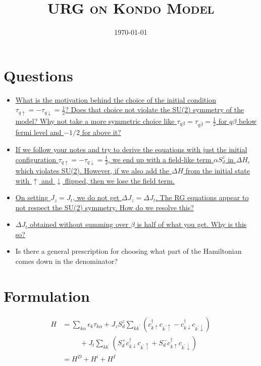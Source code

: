 \documentclass[14pt]{extarticle}
\author{}
\date{\today}
\title{\textsc{URG on Kondo Model}}
\numberwithin{equation}{section}
\begin{document}
\maketitle
\tableofcontents
\newpage
\section{Questions}
\begin{itemize}
	\item \hyperlink{q1}{ What is the motivation behind the choice of the initial condition $\tau_{q \uparrow} = -\tau_{q\downarrow} = \frac{1}{2}$? Does that choice not violate the SU(2) symmetry of the model? Why not take a more symmetric choice like $\tau_{q\beta} =  \tau_{q\bar{\beta}} = \frac{1}{2}$ for $q\beta$ below fermi level and $-1/2$ for above it?}\\[10pt]
	\item \hyperlink{field}{If we follow your notes and try to derive the equations with just the initial configuration $\tau_{q \uparrow} = -\tau_{q\downarrow} = \frac{1}{2}$, we end up with a field-like term \(\alpha S_d^z\) in \(\Delta H\), which violates SU(2). However, if we also add the \(\Delta H\) from the initial state with \(\uparrow\) and \(\downarrow\) flipped, then we lose the field term.}\\[10pt]
	\item \hyperlink{q3}{On setting \(J_z=J_t\), we do not get \(\Delta J_z = \Delta J_t\). The RG equations appear to not respect the SU(2) symmetry. How do we resolve this?}\\[10pt]
	\item \hyperlink{q4}{\(\Delta J_t\) obtained without summing over \(\beta\) is half of what you get. Why is this so?}\\[10pt]
	\item Is there a general prescription for choosing what part of the Hamiltonian comes down in the denominator?
\end{itemize}

\newpage
\section{Formulation}

\begin{align}
 H &= \sum\limits_{k \alpha} \epsilon_k \tau_{k\alpha} + J_z S_d^z \sum\limits_{kk^{\prime}} \left( c^{\dag}_{k\uparrow}c_{k^{\prime}\uparrow} - c^{\dag}_{k\downarrow}c_{k^{\prime}\downarrow} \right) \nonumber\\
& \hspace{30pt} + J_t \sum\limits_{kk^{\prime}} \left( S_d^+ c^{\dag}_{k\downarrow}c_{k^{\prime}\uparrow} + S_d^- c^{\dag}_{k\uparrow}c_{k^{\prime}\downarrow} \right) \label{eq:a32} \\
&= H^D + H^i + H^I \nonumber
\end{align}
\end{document}
